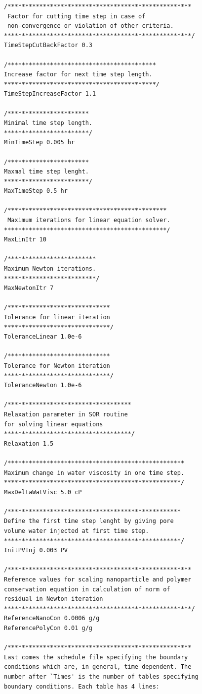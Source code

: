 \begin{appendices}
\begin{lstlisting}
/****************************************************
 Factor for cutting time step in case of 
 non-convergence or violation of other criteria.
*****************************************************/
TimeStepCutBackFactor 0.3

/******************************************
Increase factor for next time step length.
*******************************************/
TimeStepIncreaseFactor 1.1

/***********************
Minimal time step length.
************************/
MinTimeStep 0.005 hr

/***********************
Maxmal time step lenght.
************************/
MaxTimeStep 0.5 hr

/*********************************************
 Maximum iterations for linear equation solver.
**********************************************/
MaxLinItr 10

/*************************
Maximum Newton iterations.
**************************/
MaxNewtonItr 7

/*****************************
Tolerance for linear iteration
******************************/
ToleranceLinear 1.0e-6

/*****************************
Tolerance for Newton iteration
******************************/
ToleranceNewton 1.0e-6

/***********************************
Relaxation parameter in SOR routine 
for solving linear equations
************************************/
Relaxation 1.5

/**************************************************
Maximum change in water viscosity in one time step.
**************************************************/
MaxDeltaWatVisc 5.0 cP

/*************************************************
Define the first time step lenght by giving pore 
volume water injected at first time step.
**************************************************/
InitPVInj 0.003 PV

/****************************************************
Reference values for scaling nanoparticle and polymer
conservation equation in calculation of norm of
residual in Newton iteration 
*****************************************************/
ReferenceNanoCon 0.0006 g/g
ReferencePolyCon 0.01 g/g

/****************************************************
Last comes the schedule file specifying the boundary 
conditions which are, in general, time dependent. The
number after `Times' is the number of tables specifying 
boundary conditions. Each table has 4 lines:


\end{lstlisting}
\end{appendices}

